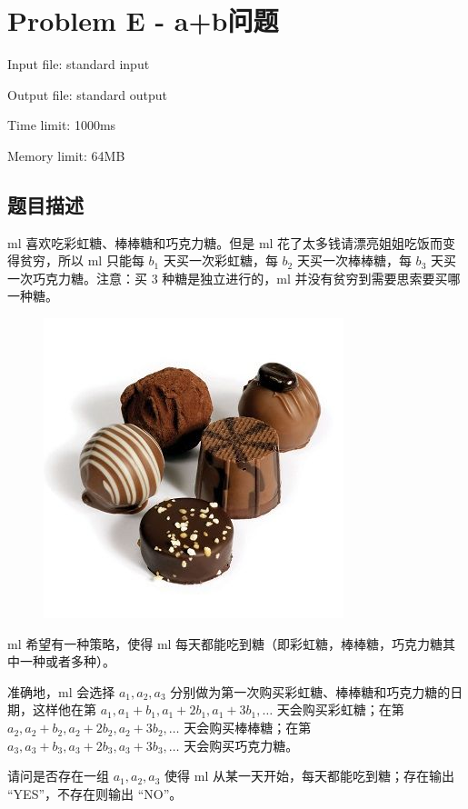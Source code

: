 \newpage
\section{Problem E - a+b问题}
{ \limitfont{}
Input file: standard input \par
Output file: standard output \par
Time limit: 1000ms \par
Memory limit: 64MB \par
}

\subsection*{题目描述}

ml 喜欢吃彩虹糖、棒棒糖和巧克力糖。但是 ml 花了太多钱请漂亮姐姐吃饭而变得贫穷，所以 ml 只能每 $b_1$ 天买一次彩虹糖，每 $b_2$ 天买一次棒棒糖，每 $b_3$ 天买一次巧克力糖。注意：买 $3$ 种糖是独立进行的，ml 并没有贫穷到需要思索要买哪一种糖。

\begin{figure}[H]
    \centering
    \includegraphics[scale=0.5]{./src/e.png}
\end{figure}

ml 希望有一种策略，使得 ml 每天都能吃到糖（即彩虹糖，棒棒糖，巧克力糖其中一种或者多种）。

准确地，ml 会选择 $a_1,a_2,a_3$ 分别做为第一次购买彩虹糖、棒棒糖和巧克力糖的日期，这样他在第 $a_1,a_1+b_1,a_1+2b_1,a_1+3b_1,\dots$ 天会购买彩虹糖；在第 $a_2,a_2+b_2,a_2+2b_2,a_2+3b_2,\dots$ 天会购买棒棒糖；在第 $a_3,a_3+b_3,a_3+2b_3,a_3+3b_3,\dots$ 天会购买巧克力糖。

请问是否存在一组 $a_1,a_2,a_3$ 使得 ml 从某一天开始，每天都能吃到糖；存在输出 ``YES''，不存在则输出 ``NO''。

